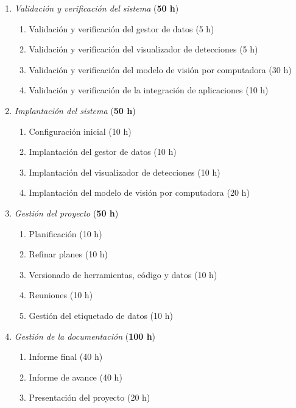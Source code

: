 \documentclass[
11pt, %
]{charter}
\begin{document}
\begin{enumerate}
  \item \textit{Validación y verificación del sistema} (\textbf{50 h})
        \begin{enumerate}
          \item Validación y verificación del gestor de datos (5 h)
          \item Validación y verificación del visualizador de detecciones (5 h)
          \item Validación y verificación del modelo de visión por computadora (30 h)
          \item Validación y verificación de la integración de aplicaciones (10 h)
        \end{enumerate}

  \item \textit{Implantación del sistema} (\textbf{50 h})
        \begin{enumerate}
          \item Configuración inicial (10 h)
          \item Implantación del gestor de datos (10 h)
          \item Implantación del visualizador de detecciones (10 h)
          \item Implantación del modelo de visión por computadora (20 h)
        \end{enumerate}

  \item \textit{Gestión del proyecto} (\textbf{50 h})
        \begin{enumerate}
          \item Planificación (10 h)
          \item Refinar planes (10 h)
          \item Versionado de herramientas, código y datos (10 h)
          \item Reuniones (10 h)
          \item Gestión del etiquetado de datos (10 h)
        \end{enumerate}

  \item \textit{Gestión de la documentación} (\textbf{100 h})
        \begin{enumerate}
          \item Informe final (40 h)
          \item Informe de avance (40 h)
          \item Presentación del proyecto (20 h)
        \end{enumerate}

\end{enumerate}
\end{document}
